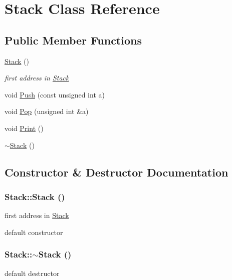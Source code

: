 \hypertarget{classStack}{
\section{Stack Class Reference}
\label{classStack}
}
\subsection*{Public Member Functions}
\begin{DoxyCompactItemize}
\item 
\hyperlink{classStack_a14cd1cba325bead4ff0a91bc6eb0f6f5}{Stack} ()
\begin{DoxyCompactList}\small\item\em first address in \hyperlink{classStack}{Stack} \item\end{DoxyCompactList}\item 
void \hyperlink{classStack_af37f0135217037f2015513f984344e7b}{Push} (const unsigned int a)
\item 
void \hyperlink{classStack_a5f548c0c416082bba3c14e34752a3d0c}{Pop} (unsigned int \&a)
\item 
void \hyperlink{classStack_a2f06e658c01857727857ee5499b2e465}{Print} ()
\item 
\hyperlink{classStack_a40bd5dff912f0e5290777c4b46d17809}{$\sim$Stack} ()
\end{DoxyCompactItemize}


\subsection{Constructor \& Destructor Documentation}
\hypertarget{classStack_a14cd1cba325bead4ff0a91bc6eb0f6f5}{
\subsubsection[{Stack}]{\setlength{\rightskip}{0pt plus 5cm}Stack::Stack ()}}
\label{classStack_a14cd1cba325bead4ff0a91bc6eb0f6f5}


first address in \hyperlink{classStack}{Stack} 

default constructor \hypertarget{classStack_a40bd5dff912f0e5290777c4b46d17809}{
\subsubsection[{$\sim$Stack}]{\setlength{\rightskip}{0pt plus 5cm}Stack::$\sim$Stack ()}}
\label{classStack_a40bd5dff912f0e5290777c4b46d17809}
default destructor 

